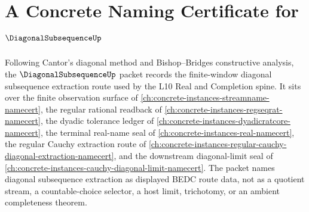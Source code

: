 \chapter{A Concrete Naming Certificate for $\DiagonalSubsequenceUp$}
\label{ch:concrete-instances-diagonal-subsequence-namecert}

Following Cantor's diagonal method and Bishop--Bridges constructive analysis, the $\DiagonalSubsequenceUp$ packet records the finite-window diagonal subsequence extraction route used by the L10 Real and Completion spine. It sits over the finite observation surface of \autoref{ch:concrete-instances-streamname-namecert}, the regular rational readback of \autoref{ch:concrete-instances-regseqrat-namecert}, the dyadic tolerance ledger of \autoref{ch:concrete-instances-dyadicratcore-namecert}, the terminal real-name seal of \autoref{ch:concrete-instances-real-namecert}, the regular Cauchy extraction route of \autoref{ch:concrete-instances-regular-cauchy-diagonal-extraction-namecert}, and the downstream diagonal-limit seal of \autoref{ch:concrete-instances-cauchy-diagonal-limit-namecert}. The packet names diagonal subsequence extraction as displayed BEDC route data, not as a quotient stream, a countable-choice selector, a host limit, trichotomy, or an ambient completeness theorem.

